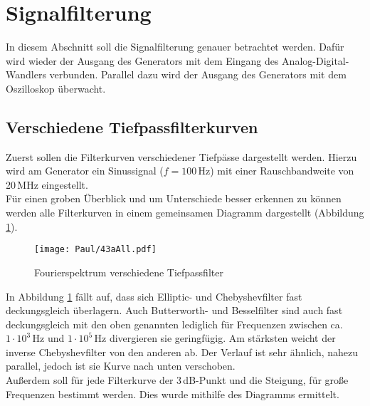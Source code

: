 \section{Signalfilterung}
In diesem Abschnitt soll die Signalfilterung genauer betrachtet werden. Dafür wird wieder der Ausgang des Generators mit dem Eingang des Analog-Digital-Wandlers verbunden. Parallel dazu wird der Ausgang des Generators mit dem Oszilloskop überwacht.

\subsection{Verschiedene Tiefpassfilterkurven}
\label{sec:VerTi}
Zuerst sollen die Filterkurven verschiedener Tiefpässe dargestellt werden. Hierzu wird am Generator ein Sinussignal ($f=100$\,Hz) mit einer Rauschbandweite von 20\,MHz eingestellt.\\

Für einen groben Überblick und um Unterschiede besser erkennen zu können werden alle Filterkurven in einem gemeinsamen Diagramm dargestellt (Abbildung \ref{fig:43aAll}). \\

\begin{figure}[h]
    \centering
    \texttt{[image: Paul/43aAll.pdf]}
    \caption{Fourierspektrum verschiedene Tiefpassfilter}
    \label{fig:43aAll}
\end{figure}

In Abbildung \ref{fig:43aAll} fällt auf, dass sich Elliptic- und Chebyshevfilter fast deckungsgleich überlagern. Auch Butterworth- und Besselfilter sind auch fast deckungsgleich mit den oben genannten lediglich für Frequenzen zwischen ca. $1\cdot 10^3$\,Hz und $1\cdot 10^5$\,Hz divergieren sie geringfügig. Am stärksten weicht der inverse Chebyshevfilter von den anderen ab. Der Verlauf ist sehr ähnlich, nahezu parallel, jedoch ist sie Kurve nach unten verschoben. \\

\newpage
Außerdem soll  für jede Filterkurve der 3\,dB-Punkt und die Steigung, für große Frequenzen bestimmt werden.
Dies wurde mithilfe des Diagramms ermittelt.

